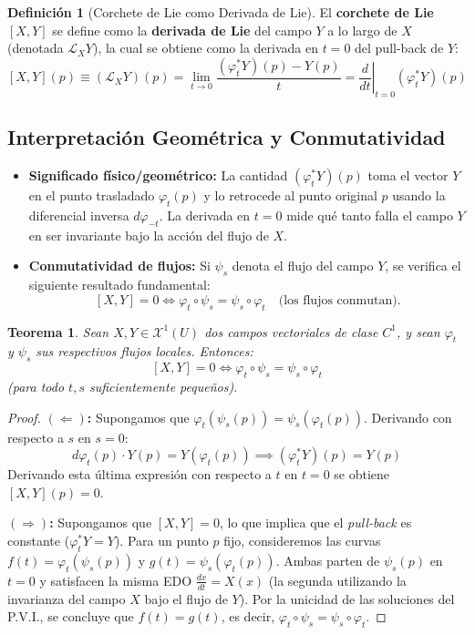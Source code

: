 \documentclass[11pt,a4paper]{article}
\theoremstyle{definition}
\newtheorem{definicion}{Definición}[section]
\theoremstyle{plain}
\newtheorem{teorema}{Teorema}[section]
\theoremstyle{remark}
\begin{document}
	\begin{definicion}[Corchete de Lie como Derivada de Lie]
		El \textbf{corchete de Lie} $[X, Y]$ se define como la \textbf{derivada de Lie} del campo $Y$ a lo largo de $X$ (denotada $\mathcal{L}_X Y$), la cual se obtiene como la derivada en $t=0$ del pull-back de $Y$:
		\[
		[X, Y](p) \equiv (\mathcal{L}_X Y)(p) = \lim_{t \to 0} \frac{(\varphi_t^* Y)(p) - Y(p)}{t} = \left. \frac{d}{dt} \right|_{t=0} (\varphi_t^* Y)(p)
		\]
	\end{definicion}
	
	\subsection*{Interpretación Geométrica y Conmutatividad}
	
	\begin{itemize}
		\item \textbf{Significado físico/geométrico:} La cantidad $(\varphi_t^* Y)(p)$ toma el vector $Y$ en el punto trasladado $\varphi_t(p)$ y lo retrocede al punto original $p$ usando la diferencial inversa $d\varphi_{-t}$. La derivada en $t=0$ mide qué tanto falla el campo $Y$ en ser invariante bajo la acción del flujo de $X$.
		\item \textbf{Conmutatividad de flujos:} Si $\psi_s$ denota el flujo del campo $Y$, se verifica el siguiente resultado fundamental:
		\[
		[X, Y] = 0 \iff \varphi_t \circ \psi_s = \psi_s \circ \varphi_t \quad \text{(los flujos conmutan)}.
		\]
	\end{itemize}
	
	\begin{teorema}
		Sean $X, Y \in \mathcal{X}^1(U)$ dos campos vectoriales de clase $C^1$, y sean $\varphi_t$ y $\psi_s$ sus respectivos flujos locales. Entonces:
		\[
		[X, Y] = 0 \iff \varphi_t \circ \psi_s = \psi_s \circ \varphi_t
		\]
		(para todo $t, s$ suficientemente pequeños).
	\end{teorema}
	
	\begin{proof}
		\textbf{$(\Leftarrow)$:} Supongamos que $\varphi_t(\psi_s(p)) = \psi_s(\varphi_t(p))$. Derivando con respecto a $s$ en $s = 0$:
		\[
		d\varphi_t(p) \cdot Y(p) = Y(\varphi_t(p)) \implies (\varphi_t^* Y)(p) = Y(p)
		\]
		Derivando esta última expresión con respecto a $t$ en $t = 0$ se obtiene $[X, Y](p) = 0$.
		
		\textbf{$(\Rightarrow)$:} Supongamos que $[X, Y] = 0$, lo que implica que el \textit{pull-back} es constante ($\varphi_t^* Y = Y$). Para un punto $p$ fijo, consideremos las curvas $f(t) = \varphi_t(\psi_s(p))$ y $g(t) = \psi_s(\varphi_t(p))$. Ambas parten de $\psi_s(p)$ en $t=0$ y satisfacen la misma EDO $\frac{dx}{dt} = X(x)$ (la segunda utilizando la invarianza del campo $X$ bajo el flujo de $Y$). Por la unicidad de las soluciones del P.V.I., se concluye que $f(t) = g(t)$, es decir, $\varphi_t \circ \psi_s = \psi_s \circ \varphi_t$.
	\end{proof}
	
\end{document}
